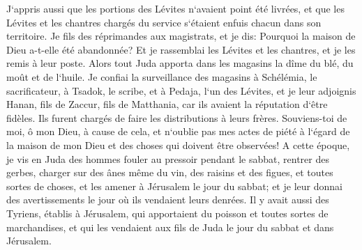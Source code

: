 \verse J`appris aussi que les portions des Lévites n`avaient point été livrées, et que les Lévites et les chantres chargés du service s`étaient enfuis chacun dans son territoire. 
\verse Je fils des réprimandes aux magistrats, et je dis: Pourquoi la maison de Dieu a-t-elle été abandonnée? Et je rassemblai les Lévites et les chantres, et je les remis à leur poste. 
\verse Alors tout Juda apporta dans les magasins la dîme du blé, du moût et de l`huile. 
\verse Je confiai la surveillance des magasins à Schélémia, le sacrificateur, à Tsadok, le scribe, et à Pedaja, l`un des Lévites, et je leur adjoignis Hanan, fils de Zaccur, fils de Matthania, car ils avaient la réputation d`être fidèles. Ils furent chargés de faire les distributions à leurs frères. 
\verse Souviens-toi de moi, ô mon Dieu, à cause de cela, et n`oublie pas mes actes de piété à l`égard de la maison de mon Dieu et des choses qui doivent être observées! 
\verse A cette époque, je vis en Juda des hommes fouler au pressoir pendant le sabbat, rentrer des gerbes, charger sur des ânes même du vin, des raisins et des figues, et toutes sortes de choses, et les amener à Jérusalem le jour du sabbat; et je leur donnai des avertissements le jour où ils vendaient leurs denrées. 
\verse Il y avait aussi des Tyriens, établis à Jérusalem, qui apportaient du poisson et toutes sortes de marchandises, et qui les vendaient aux fils de Juda le jour du sabbat et dans Jérusalem. 
